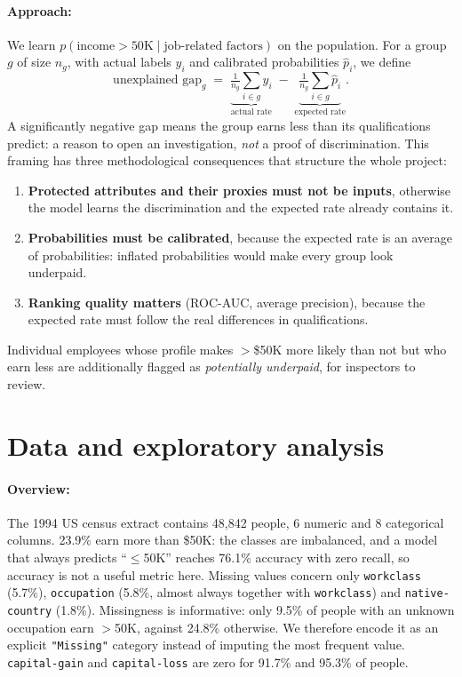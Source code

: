 \documentclass[11pt,a4paper]{article}
\begin{document}
\paragraph{Approach:} We learn $p(\text{income}>50\text{K} \mid \text{job-related factors})$ on the population. For a group $g$ of size $n_g$, with actual labels $y_i$ and calibrated probabilities $\hat p_i$, we define
\begin{equation}
\text{unexplained gap}_g \;=\; \underbrace{\tfrac{1}{n_g}\textstyle\sum_{i\in g} y_i}_{\text{actual rate}} \;-\; \underbrace{\tfrac{1}{n_g}\textstyle\sum_{i\in g} \hat p_i}_{\text{expected rate}} .
\end{equation}
A significantly negative gap means the group earns less than its qualifications predict: a reason to open an investigation, \emph{not} a proof of discrimination. This framing has three methodological consequences that structure the whole project:
\begin{enumerate}
\item \textbf{Protected attributes and their proxies must not be inputs}, otherwise the model learns the discrimination and the expected rate already contains it.
\item \textbf{Probabilities must be calibrated}, because the expected rate is an average of probabilities: inflated probabilities would make every group look underpaid.
\item \textbf{Ranking quality matters} (ROC-AUC, average precision), because the expected rate must follow the real differences in qualifications.
\end{enumerate}
Individual employees whose profile makes $>$\$50K more likely than not but who earn less are additionally flagged as \emph{potentially underpaid}, for inspectors to review.

\section{Data and exploratory analysis}

\paragraph{Overview:} The 1994 US census extract contains 48{,}842 people, 6 numeric and 8 categorical columns. 23.9\% earn more than \$50K: the classes are imbalanced, and a model that always predicts ``$\le$50K'' reaches 76.1\% accuracy with zero recall, so accuracy is not a useful metric here. Missing values concern only \texttt{workclass} (5.7\%), \texttt{occupation} (5.8\%, almost always together with \texttt{workclass}) and \texttt{native-country} (1.8\%). Missingness is informative: only 9.5\% of people with an unknown occupation earn $>$50K, against 24.8\% otherwise. We therefore encode it as an explicit \texttt{"Missing"} category instead of imputing the most frequent value. \texttt{capital-gain} and \texttt{capital-loss} are zero for 91.7\% and 95.3\% of people.
\end{document}
